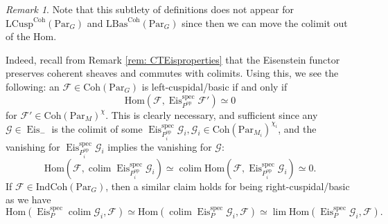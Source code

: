 \documentclass{amsart}
\theoremstyle{definition}
\theoremstyle{remark}
\newtheorem{remark}[theorem]{Remark}
\numberwithin{equation}{section}
\DeclareMathOperator{\colim}{colim}
\newcommand{\mc}{\mathcal}
\newcommand{\Hom}{\mathrm{Hom}}
\newcommand{\spec}{\mathrm{spec}}
\newcommand{\op}{\mathrm{op}}
\newcommand{\Par}{\mathrm{Par}}
\newcommand{\IndCoh}{\mathrm{IndCoh}}
\DeclareMathOperator{\Eis}{\mathrm{Eis}}
\newcommand{\Coh}{\mathrm{Coh}}
\newcommand{\LCusp}{\mathrm{LCusp}}
\newcommand{\LBas}{\mathrm{LBas}}
\begin{document}
\begin{remark}{\label{rem: BasCohaltdef}}
 Note that this subtlety of definitions does not appear for $\LCusp^{\Coh}(\Par_G)$ and $\LBas^{\Coh}(\Par_G)$ since then we can move the colimit out of the $\Hom$.
 
 Indeed, recall from Remark \ref{rem: CTEisproperties} that the Eisenstein functor preserves coherent sheaves and commutes with colimits. Using this, we see the following: an $\mc F \in \Coh(\Par_G)$ is left-cuspidal/basic if and only if
\[
\Hom(\mc F, \Eis^\spec_{P^\op} \mc F')\simeq 0
\]
for $\mc F'\in \Coh(\Par_M)^\chi$. This is clearly necessary, and sufficient since any $\mc G \in \Eis_-$ is the colimit of some $\Eis^\spec_{P_i^{\op}}\mc G_i, \mc G_i\in \Coh(\Par_{M_i})^{\chi_i}$, and the vanishing for $\Eis^\spec_{P_i^\op}\mc G_i$ implies the vanishing for $\mc G$:
\[
\Hom(\mc F,  \colim \Eis^\spec_{P_i^\op} \mc  G_i)\simeq \colim \Hom(\mc F, \Eis^\spec_{P_i^\op} \mc  G_i)\simeq 0. 
\]
If $\mc F\in \IndCoh(\Par_G)$, then a similar claim holds for being right-cuspidal/basic as we have
\[
\Hom(\Eis^\spec_{P} \colim\mc  G_i, \mc F)\simeq  \Hom(\colim\Eis^\spec_{P}\mc  G_i, \mc F)\simeq \lim \Hom(\Eis^\spec_{P} \mc  G_i, \mc F). 
\]
\end{remark}
\end{document}
